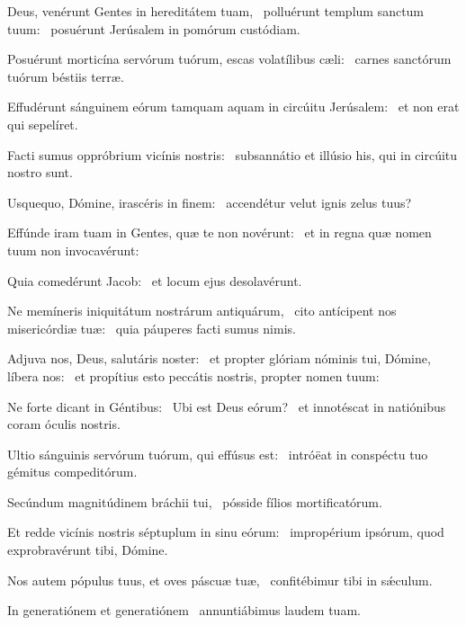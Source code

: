 \item Deus, venérunt Gentes in hereditátem tuam,~\pscross{} polluérunt templum sanctum tuum:~\psstar{} posuérunt Jerúsalem in pomórum custódiam.

\item Posuérunt morticína servórum tuórum, escas volatílibus cæli:~\psstar{} carnes sanctórum tuórum béstiis terræ.

\item Effudérunt sánguinem eórum tamquam aquam in circúitu Jerúsalem:~\psstar{} et non erat qui sepelíret.

\item Facti sumus oppróbrium vicínis nostris:~\psstar{} subsannátio et illúsio his, qui in circúitu nostro sunt.

\item Usquequo, Dómine, irascéris in finem:~\psstar{} accendétur velut ignis zelus tuus?

\item Effúnde iram tuam in Gentes, quæ te non novérunt:~\psstar{} et in regna quæ nomen tuum non invocavérunt:

\item Quia comedérunt Jacob:~\psstar{} et locum ejus desolavérunt.

\item Ne memíneris iniquitátum nostrárum antiquárum,~\pscross{} cito antícipent nos misericórdiæ tuæ:~\psstar{} quia páuperes facti sumus nimis.

\item Adjuva nos, Deus, salutáris noster:~\pscross{} et propter glóriam nóminis tui, Dómine, líbera nos:~\psstar{} et propítius esto peccátis nostris, propter nomen tuum:

\item Ne forte dicant in Géntibus:~\pscross{} Ubi est Deus eórum?~\psstar{} et innotéscat in natiónibus coram óculis nostris.

\item Ultio sánguinis servórum tuórum, qui effúsus est:~\psstar{} intróëat in conspéctu tuo gémitus compeditórum.

\item Secúndum magnitúdinem bráchii tui,~\psstar{} pósside fílios mortificatórum.

\item Et redde vicínis nostris séptuplum in sinu eórum:~\psstar{} impropérium ipsórum, quod exprobravérunt tibi, Dómine.

\item Nos autem pópulus tuus, et oves páscuæ tuæ,~\psstar{} confitébimur tibi in sǽculum.

\item In generatiónem et generatiónem~\psstar{} annuntiábimus laudem tuam.